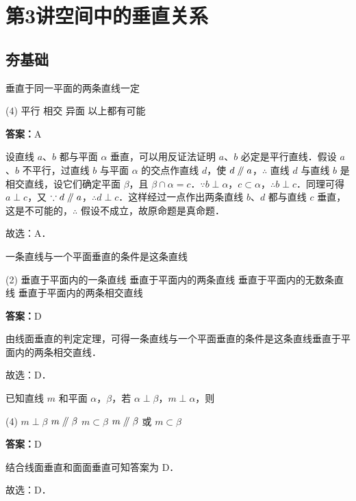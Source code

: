 \section{第3讲\quad 空间中的垂直关系}
\subsection{夯基础}

\begin{example}[\bkstar{1}{5}]
垂直于同一平面的两条直线一定
\begin{tasks}(4)
    \task 平行
    \task 相交
    \task 异面
    \task 以上都有可能
\end{tasks}
\end{example}
\begin{solution}
\textbf{答案：}A

设直线 $a$、$b$ 都与平面 $\alpha$ 垂直，可以用反证法证明 $a$、$b$ 必定是平行直线．假设 $a$、$b$ 不平行，过直线 $b$ 与平面 $\alpha$ 的交点作直线 $d$，使 $d\mathrel{/\mkern-5mu/} a$，$\therefore$ 直线 $d$ 与直线 $b$ 是相交直线，设它们确定平面 $\beta$，且 $\beta\cap\alpha=c$．$\because b\perp\alpha$，$c\subset\alpha$，$\therefore b\perp c$．同理可得 $a\perp c$，又 $\because d\mathrel{/\mkern-5mu/} a$，$\therefore d\perp c$．这样经过一点作出两条直线 $b$、$d$ 都与直线 $c$ 垂直，这是不可能的，$\therefore$ 假设不成立，故原命题是真命题．

故选：A．
\end{solution}

\vspace{2em}

\begin{example}[\bkstar{1}{5}]
一条直线与一个平面垂直的条件是这条直线
\begin{tasks}(2)
    \task 垂直于平面内的一条直线
    \task 垂直于平面内的两条直线
    \task 垂直于平面内的无数条直线
    \task 垂直于平面内的两条相交直线
\end{tasks}
\end{example}
\begin{solution}
\textbf{答案：}D

由线面垂直的判定定理，可得一条直线与一个平面垂直的条件是这条直线垂直于平面内的两条相交直线．

故选：D．
\end{solution}

\vspace{2em}

\begin{example}[\bkstar{2}{5}]
已知直线 $m$ 和平面 $\alpha$，$\beta$，若 $\alpha\perp\beta$，$m\perp\alpha$，则
\begin{tasks}(4)
    \task $m\perp\beta$
    \task $m\mathrel{/\mkern-5mu/}\beta$
    \task $m\subset\beta$
    \task $m\mathrel{/\mkern-5mu/}\beta$ 或 $m\subset\beta$
\end{tasks}
\end{example}
\begin{solution}
\textbf{答案：}D

结合线面垂直和面面垂直可知答案为 D．

故选：D．
\end{solution}

